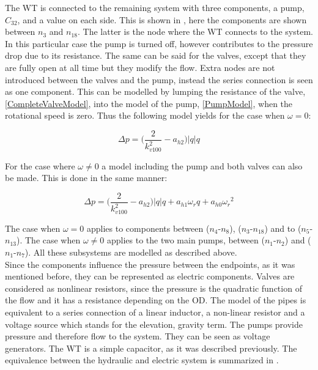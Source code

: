 The WT is connected to the remaining system with three components, a pump, $C_{32}$, and a value on each side. This is shown in , here the components are shown between $n_3$ and $n_{18}$. 
The latter is the node where the WT connects to the system. In this particular case the pump is turned off, however contributes to the pressure drop due to its resistance. The same can be said for the valves, except that they are fully open at all time but they modify the flow. Extra nodes are not introduced between the valves and the pump, instead the series connection is seen as one component. This can be modelled by lumping the resistance of the valve, \eqref{CompleteValveModel}, into the model of the pump, \eqref{PumpModel}, when the rotational speed is zero. Thus the following model yields for the case when $\omega = 0$:

\begin{equation}
  \Delta p = \Big(\frac{2}{k_{v100}^2} - a_{h2}\Big)|q| q 
  \label{omega_zero}
\end{equation}

For the case where $\omega \neq 0$ a model including the pump and both valves can also be made. This is done in the same manner: 

\begin{equation}
  \Delta p = \Big(\frac{2}{k_{v100}^2} - a_{h2}\Big)|q| q  + a_{h1} \omega_r q + a_{h0}{\omega_r}^2
  \label{omega_notzero}
\end{equation}

The case when $\omega = 0$ applies to components between ($n_4$-$n_8$), ($n_3$-$n_{18}$)  and to ($n_5$-$n_{13}$). The case when $\omega \neq 0$ applies to the two main pumps, between ($n_1$-$n_2$) and ($n_1$-$n_7$). All these subsystems are modelled as described above. 
\\
Since the components influence the pressure between the endpoints, as it was mentioned before, they can be represented as electric components. Valves are considered as nonlinear resistors, since the pressure is the quadratic function of the flow and it has a resistance depending on the OD. The model of the pipes is equivalent to a series connection of a linear inductor, a non-linear resistor and a voltage source which stands for the elevation, gravity term. The pumps provide pressure and therefore flow to the system. They can be seen as voltage generators. The WT is a simple capacitor, as it was described previously. The equivalence between the hydraulic and electric system is summarized in .

